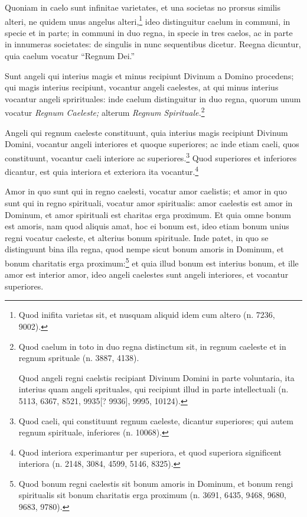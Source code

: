 
\begin{topic}{20}
    Quoniam in caelo sunt infinitae varietates, et una societas no prorsus similis alteri, ne quidem unus angelus
    alteri,\footnote{Quod inifita varietas sit, et nusquam aliquid idem cum altero (n. 7236, 9002).} ideo distinguitur
    caelum in communi, in specie et in parte; in communi in duo regna, in specie in tres caelos, ac in parte in
    innumeras societates: de singulis in nunc sequentibus dicetur.
    Reegna dicuntur, quia caelum vocatur ``Regnum Dei.''
\end{topic}

\begin{topic}{21}
    Sunt angeli qui interius magis et minus recipiunt Divinum a Domino procedens; qui magis interius recipiunt, vocantur
    angeli caelestes, at qui minus interius vocantur angeli sprirituales: inde caelum distinguitur in duo regna, quorum
    unum vocatur \emph{Regnum Caeleste;} alterum \emph{Regnum Spirituale.}\footnote{Quod caelum in toto in duo regna
    distinctum sit, in regnum caeleste et in regnum sprituale (n. 3887, 4138).

    Quod angeli regni caelstis recipiant Divinum Domini in parte voluntaria, ita interius quam angeli sprituales, qui
    recipiunt illud in parte intellectuali (n. 5113, 6367, 8521, 9935[? 9936], 9995, 10124).}
\end{topic}

\begin{topic}{22}
    Angeli qui regnum caeleste constituunt, quia interius magis recipiunt Divinum Domini, vocantur angeli interiores et
    quoque superiores; ac inde etiam caeli, quos constituunt, vocantur caeli interiore ac superiores.\footnote{Quod
    caeli, qui constituunt regnum caeleste, dicantur superiores; qui autem regnum spirituale, inferiores (n. 10068).}
    Quod superiores et inferiores dicantur, est quia interiora et exteriora ita vocantur.\footnote{Quod interiora
    experimantur per superiora, et quod superiora significent interiora (n. 2148, 3084, 4599, 5146, 8325).}
\end{topic}

\begin{topic}{23}
    Amor in quo sunt qui in regno caelesti, vocatur amor caelistis; et amor in quo sunt qui in regno spirituali, vocatur
    amor spiritualis: amor caelestis est amor in Dominum, et amor spirituali est charitas erga proximum.
    Et quia omne bonum est amoris, nam quod aliquis amat, hoc ei bonum est, ideo etiam bonum unius regni vocatur
    caeleste, et alterius bonum spirituale.
    Inde patet, in quo se distinguunt bina illa regna, quod nempe sicut bonum amoris in Dominum, et bonum charitatis
    erga proximum:\footnote{Quod bonum regni caelestis sit bonum amoris in Dominum, et bonum rengi spiritualis sit bonum
    charitatis erga proximum (n. 3691, 6435, 9468, 9680, 9683, 9780).} et quia illud bonum est interius bonum, et ille
    amor est interior amor, ideo angeli caelestes sunt angeli interiores, et vocantur superiores.
\end{topic}

